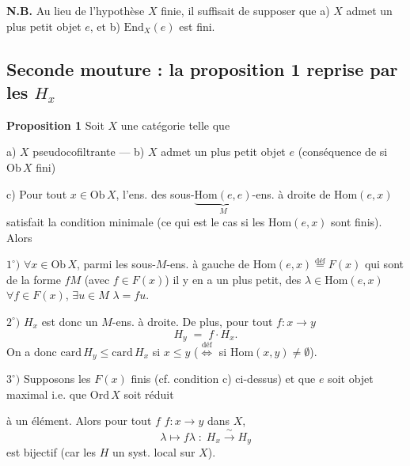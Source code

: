 \documentclass[11pt,a4paper]{article}
\begin{document}

\textbf{N.B.} Au lieu de l'hypothèse $X$ finie, il suffisait de supposer que
a) $X$ admet un plus petit objet $e$, et b) $\mathrm{End}_X(e)$ est fini.

\subsection*{Seconde mouture : la proposition 1 reprise par les $H_x$}


\textbf{Proposition 1} Soit $X$ une catégorie telle que

a) $X$ pseudocofiltrante --- b) $X$ admet un plus petit objet $e$
(conséquence de  si $\mathrm{Ob}\, X$ fini)

c) Pour tout $x \in \mathrm{Ob}\, X$, l'ens. des
sous-$\underbrace{\mathrm{Hom}(e,e)}_{M}$-ens. à droite de $\mathrm{Hom}(e,x)$
satisfait la condition minimale (ce qui est le cas si les $\mathrm{Hom}(e,x)$
sont finis). Alors

$1^{\circ})$ $\forall x \in \mathrm{Ob}\, X$, parmi les sous-$M$-ens. à gauche
de $\mathrm{Hom}(e,x) \overset{\text{déf}}{=} F(x)$ qui sont de la forme $fM$
(avec $f \in F(x)$) il y en a
un plus petit,  \ill{} des
$\lambda \in \mathrm{Hom}(e,x)$   $\forall f \in F(x)$, $\exists u \in M$ \ill{}
$\lambda = fu$.


$2^{\circ})$ $H_x$ est donc un $M$-ens. à droite. De plus, pour tout
$f : x \to y$ \ill{}
\[
  H_y \;=\; f \cdot H_x .
\]
On a donc $\mathrm{card}\, H_y \leq \mathrm{card}\, H_x$ si $x \leq y$
($\overset{\text{déf}}{\Longleftrightarrow}$ si $\mathrm{Hom}(x,y) \neq
\emptyset$).

$3^{\circ})$ Supposons les $F(x)$ finis (cf. condition c) ci-dessus) et que $e$
soit  objet maximal i.e. que $\mathrm{Ord}\, X$ soit réduit


à un élément. Alors pour tout $f$ 
$f : x \to y$ dans $X$, 
\[
  \lambda \longmapsto f\lambda \;:\; H_x \xrightarrow{\ \sim\ } H_y
\]
est bijectif (car les $H$  un syst. local sur $X$).
\end{document}
